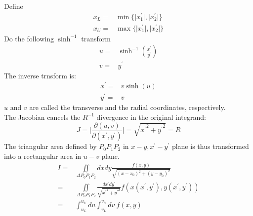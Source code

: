 \documentclass [10pt,letterpaper]{article}
\begin{document}
Define
\begin{equation} \label{eq:def-singular-near-singular-xL-xU}
	\begin{split} 
		x_L
		=&
		\min
		\{
			\lvert x_1^{\prime} \rvert,
			\lvert x_2^{\prime} \rvert
		\}
		\\
		x_U
		=&
		\max
		\{
			\lvert x_1^{\prime} \rvert,
			\lvert x_2^{\prime} \rvert
		\}
	\end{split} 
\end{equation}
Do the following $\sinh^{-1}$ transform
\begin{equation}  \label{eq:def-singular-near-singular-transform-u-v-xp-yp}
	\begin{split}
	       u
	       =&
	       \sinh^{-1}
	       (
			\frac
			{x^{\prime}}
			{y^{\prime}}
	       )
	       \\
	       v
	       =&
	       y^{\prime}
	\end{split}
\end{equation}
The inverse trnsform is:
\begin{equation}  \label{eq:def-singular-near-singular-transform-xp-yp-u-v}
	\begin{split}
		x^{\prime}
		=& 
		v
		\sinh(u)
		\\
		y^{\prime}
		=&
		v
	\end{split}
\end{equation}
$u$ and $v$ are called the transverse and the radial coordinates, respectively.
\\
The Jacobian cancels the $R^{-1}$ divergence in the original integrand:
\begin{equation} \label{eq:result-singular-near-singular-jacobian-u-v-xp-yp}
	J
	=
	\bigg\lvert
		\frac
		{\partial(u,v)}
		{\partial(x^{\prime},y^{\prime})} 
	\bigg\rvert 
	=
	\sqrt{
		{x^{\prime}}^2
		+
		{y^{\prime}}^2
	}
	=
	R
\end{equation}
The triangular area defined by $P_0 P_1 P_2$ in $x-y,x^{\prime}-y^{\prime}$ plane is thus transformed into a rectangular area in $u-v$ plane.
\begin{equation} \label{eq:singular-near-singular-integral-result}
	\begin{split} 
		I
		=&
		\iint 
		\limits_{\Delta P_0 P_1 P_2}
		dx dy
		\frac{ f(x,y) }
		{ \sqrt{(x-x_0)^2+(y-y_0)^2} }
		\\
		=& 
		\iint 
		\limits_{\Delta P_0 P_1 P_2}
		\frac
		{  dx^{\prime} dy^{\prime}  }
		{ \sqrt{{x^{\prime}}^2+{y^{\prime}}^2} }
		f(x(x^{\prime},y^{\prime}),y(x^{\prime},y^{\prime}))
		\\
		=&
		\int 
		\nolimits_{u_L}^{u_U}
		du
		\int 
		\nolimits_{v_L}^{v_U}
		dv
		\ f(x,y)
	\end{split}
\end{equation}
\end{document}
